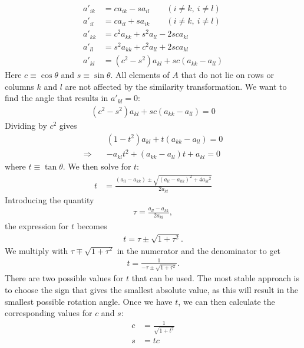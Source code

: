 \documentclass{article}
\begin{document}
\begin{align}
	a'_{ik} &= ca_{ik} - sa_{il} \qquad (i \neq k,\:i \neq l) \label{eq:tr1} \\
	a'_{il} &= ca_{il} + sa_{ik} \qquad (i \neq k,\:i \neq l) \label{eq:tr2} \\
	a'_{kk} &= c^2a_{kk} + s^2a_{ll} - 2sca_{kl} \\
	a'_{ll} &= s^2a_{kk} + c^2a_{ll} + 2sca_{kl} \label{eq:tr4} \\
	a'_{kl} &= (c^2 - s^2)a_{kl} + sc(a_{kk} - a_{ll})
\end{align}
Here $c \equiv \cos{\theta}$ and $s \equiv \sin{\theta}$. All elements of $A$ that do not lie on rows or columns $k$ and $l$ are not affected by the similarity transformation. We want to find the angle that results in $a'_{kl} = 0$:
\begin{align*}
	(c^2 - s^2)a_{kl} + sc(a_{kk} - a_{ll}) = 0
\end{align*}
Dividing by $c^2$ gives
\begin{align*}
	&(1 - t^2)a_{kl} + t(a_{kk} - a_{ll}) = 0 \\
	\Rightarrow \quad &-a_{kl}t^2 + (a_{kk} - a_{ll})t + a_{kl} = 0
\end{align*}
where $t \equiv \tan{\theta}$. We then solve for $t$:
\begin{align*}
	t &= \frac{(a_{ll} - a_{kk}) \pm \sqrt{(a_{ll} - a_{kk})^2 + 4{a_{kl}}^2}}{2a_{kl}}
\end{align*}
Introducing the quantity
\begin{align}
	\tau = \frac{a_{ll} - a_{kk}}{2a_{kl}}, \label{eq:tau}
\end{align}
the expression for $t$ becomes
\begin{align*}
	t = \tau \pm \sqrt{1 + \tau^2}.
\end{align*}
We multiply with $\tau \mp \sqrt{1 + \tau^2}$ in the numerator and the denominator to get 
\begin{align}
	t = \frac{1}{-\tau \pm \sqrt{1 + \tau^2}}. \label{eq:tan}
\end{align}
There are two possible values for $t$ that can be used. The most stable approach is to choose the sign that gives the smallest absolute value, as this will result in the smallest possible rotation angle. Once we have $t$, we can then calculate the corresponding values for $c$ and $s$:
\begin{align}
	c &= \frac{1}{\sqrt{1 + t^2}} \label{eq:cos} \\
	s &= tc \label{eq:sin}
\end{align}
\end{document}
